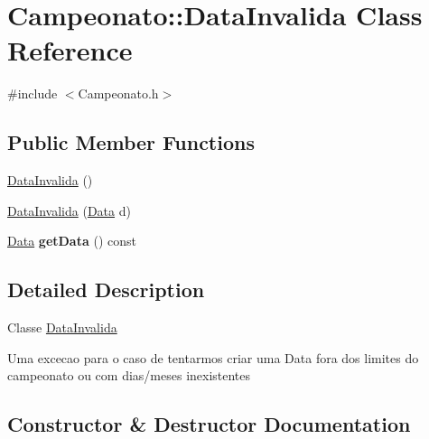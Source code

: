 \hypertarget{class_campeonato_1_1_data_invalida}{}\section{Campeonato\+:\+:Data\+Invalida Class Reference}
\label{class_campeonato_1_1_data_invalida}


{\ttfamily \#include $<$Campeonato.\+h$>$}

\subsection*{Public Member Functions}
\begin{DoxyCompactItemize}
\item 
\hyperlink{class_campeonato_1_1_data_invalida_afc48064c2fd3d438bc18d8c4287f0757}{Data\+Invalida} ()
\item 
\hyperlink{class_campeonato_1_1_data_invalida_ae153bc364097fa2f5d6936056a09650f}{Data\+Invalida} (\hyperlink{class_data}{Data} d)
\item 
\hypertarget{class_campeonato_1_1_data_invalida_a6640f6a20888eb267409ef30582914ed}{}\hyperlink{class_data}{Data} {\bfseries get\+Data} () const \label{class_campeonato_1_1_data_invalida_a6640f6a20888eb267409ef30582914ed}

\end{DoxyCompactItemize}


\subsection{Detailed Description}
Classe \hyperlink{class_campeonato_1_1_data_invalida}{Data\+Invalida} \begin{DoxyVerb}Uma excecao para o caso de tentarmos criar uma Data fora dos limites do campeonato ou com dias/meses inexistentes\end{DoxyVerb}
 

\subsection{Constructor \& Destructor Documentation}
\hypertarget{class_campeonato_1_1_data_invalida_afc48064c2fd3d438bc18d8c4287f0757}{}

